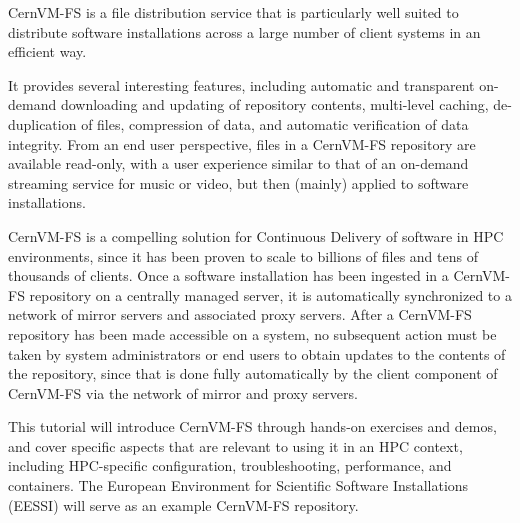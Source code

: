CernVM-FS is a file distribution service that is particularly well suited to distribute software installations across a large number of client systems in an efficient way.

It provides several interesting features, including automatic and transparent on-demand downloading and updating of repository contents, multi-level caching, de-duplication of files, compression of data, and automatic verification of data integrity.
From an end user perspective, files in a CernVM-FS repository are available read-only, with a user experience similar to that of an on-demand streaming service for music or video, but then (mainly) applied to software installations.

CernVM-FS is a compelling solution for Continuous Delivery of software in HPC environments, since it has been proven to scale to billions of files and tens of thousands of clients. Once a software installation has been ingested in a CernVM-FS repository on a centrally managed server, it is
automatically synchronized to a network of mirror servers and associated proxy servers.
After a CernVM-FS repository has been made accessible on a system, no subsequent action must be taken by system administrators or end users to obtain updates to the contents of the repository, since that is done fully automatically by the client component of CernVM-FS via the network of mirror and proxy servers.

This tutorial will introduce CernVM-FS through hands-on exercises and demos, and cover specific aspects that are relevant to using it in an HPC context, including HPC-specific configuration, troubleshooting, performance, and containers. The European Environment for Scientific Software
Installations (EESSI) will serve as an example CernVM-FS repository.



